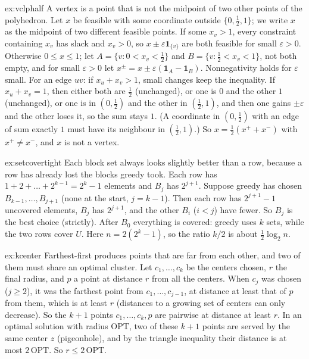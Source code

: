 \begin{solution}{ex:vclphalf}
\idea A vertex is a point that is not the midpoint of two other points of the polyhedron.
\writeup Let $x$ be feasible with some coordinate outside $\{0,\frac12,1\}$; we write $x$ as the midpoint of two different feasible points. If some $x_v>1$, every constraint containing $x_v$ has slack and $x_v>0$, so $x\pm\varepsilon\mathbf 1_{\{v\}}$ are both feasible for small $\varepsilon>0$. Otherwise $0\le x\le1$; let $A=\{v:0<x_v<\frac12\}$ and $B=\{v:\frac12<x_v<1\}$, not both empty, and for small $\varepsilon>0$ let $x^\pm=x\pm\varepsilon(\mathbf 1_A-\mathbf 1_B)$. Nonnegativity holds for $\varepsilon$ small.
For an edge $uv$: if $x_u+x_v>1$, small changes keep the inequality. If $x_u+x_v=1$, then either both are $\frac12$ (unchanged), or one is $0$ and the other $1$ (unchanged), or one is in $(0,\frac12)$ and the other in $(\frac12,1)$, and then one gains $\pm\varepsilon$ and the other loses it, so the sum stays $1$. (A coordinate in $(0,\frac12)$ with an edge of sum exactly $1$ must have its neighbour in $(\frac12,1)$.) So $x=\frac12(x^++x^-)$ with $x^+\ne x^-$, and $x$ is not a vertex.
\end{solution}

\begin{solution}{ex:setcovertight}
\idea Each block set always looks slightly better than a row, because a row has already lost the blocks greedy took.
\writeup Each row has $1+2+\dots+2^{k-1}=2^k-1$ elements and $B_j$ has $2^{j+1}$. Suppose greedy has chosen $B_{k-1},\dots,B_{j+1}$ (none at the start, $j=k-1$). Then each row has $2^{j+1}-1$ uncovered elements, $B_j$ has $2^{j+1}$, and the other $B_i$ ($i<j$) have fewer. So $B_j$ is the best choice (strictly). After $B_0$ everything is covered: greedy uses $k$ sets, while the two rows cover $U$. Here $n=2(2^k-1)$, so the ratio $k/2$ is about $\frac12\log_2n$.
\end{solution}

\begin{solution}{ex:kcenter}
\idea Farthest-first produces points that are far from each other, and two of them must share an optimal cluster.
\writeup Let $c_1,\dots,c_k$ be the centers chosen, $r$ the final radius, and $p$ a point at distance $r$ from all the centers. When $c_j$ was chosen ($j\ge2$), it was the farthest point from $c_1,\dots,c_{j-1}$, at distance at least that of $p$ from them, which is at least $r$ (distances to a growing set of centers can only decrease). So the $k+1$ points $c_1,\dots,c_k,p$ are pairwise at distance at least $r$.
In an optimal solution with radius $\mathrm{OPT}$, two of these $k+1$ points are served by the same center $z$ (pigeonhole), and by the triangle inequality their distance is at most $2\,\mathrm{OPT}$. So $r\le2\,\mathrm{OPT}$.
\end{solution}

